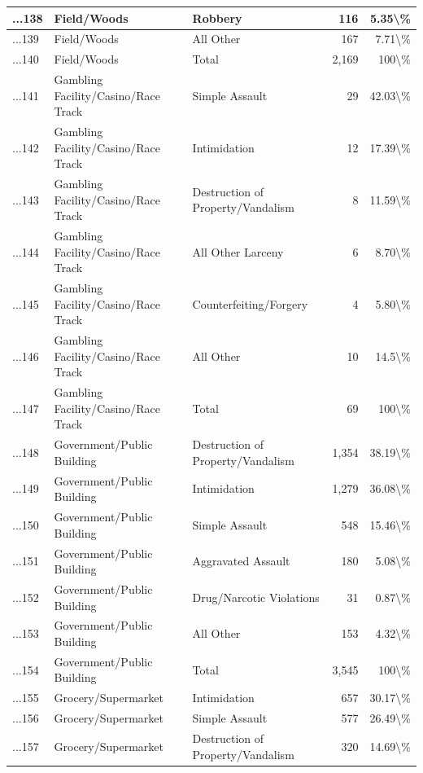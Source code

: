 \documentclass[
]{krantz}
\begin{document}
\begin{longtable}[t]{l|l|l|r|r}
\hline
...138 & Field/Woods & Robbery & 116 & 5.35\textbackslash{}\%\\
\hline
...139 & Field/Woods & All Other & 167 & 7.71\textbackslash{}\%\\
\hline
...140 & Field/Woods & Total & 2,169 & 100\textbackslash{}\%\\
\hline
...141 & Gambling Facility/Casino/Race Track & Simple Assault & 29 & 42.03\textbackslash{}\%\\
\hline
...142 & Gambling Facility/Casino/Race Track & Intimidation & 12 & 17.39\textbackslash{}\%\\
\hline
...143 & Gambling Facility/Casino/Race Track & Destruction of Property/Vandalism & 8 & 11.59\textbackslash{}\%\\
\hline
...144 & Gambling Facility/Casino/Race Track & All Other Larceny & 6 & 8.70\textbackslash{}\%\\
\hline
...145 & Gambling Facility/Casino/Race Track & Counterfeiting/Forgery & 4 & 5.80\textbackslash{}\%\\
\hline
...146 & Gambling Facility/Casino/Race Track & All Other & 10 & 14.5\textbackslash{}\%\\
\hline
...147 & Gambling Facility/Casino/Race Track & Total & 69 & 100\textbackslash{}\%\\
\hline
...148 & Government/Public Building & Destruction of Property/Vandalism & 1,354 & 38.19\textbackslash{}\%\\
\hline
...149 & Government/Public Building & Intimidation & 1,279 & 36.08\textbackslash{}\%\\
\hline
...150 & Government/Public Building & Simple Assault & 548 & 15.46\textbackslash{}\%\\
\hline
...151 & Government/Public Building & Aggravated Assault & 180 & 5.08\textbackslash{}\%\\
\hline
...152 & Government/Public Building & Drug/Narcotic Violations & 31 & 0.87\textbackslash{}\%\\
\hline
...153 & Government/Public Building & All Other & 153 & 4.32\textbackslash{}\%\\
\hline
...154 & Government/Public Building & Total & 3,545 & 100\textbackslash{}\%\\
\hline
...155 & Grocery/Supermarket & Intimidation & 657 & 30.17\textbackslash{}\%\\
\hline
...156 & Grocery/Supermarket & Simple Assault & 577 & 26.49\textbackslash{}\%\\
\hline
...157 & Grocery/Supermarket & Destruction of Property/Vandalism & 320 & 14.69\textbackslash{}\%\\

\end{longtable}
\end{document}
